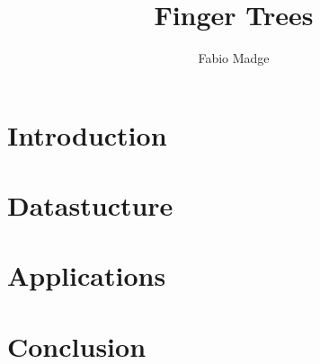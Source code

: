 \documentclass[a4paper]{article}
\begin{document}
\title{Finger Trees}
\author{Fabio Madge}
\date{}
\maketitle

\begin{abstract}

\end{abstract}

\section{Introduction}


\section{Datastucture}


\section{Applications}


\section{Conclusion}




\end{document}
